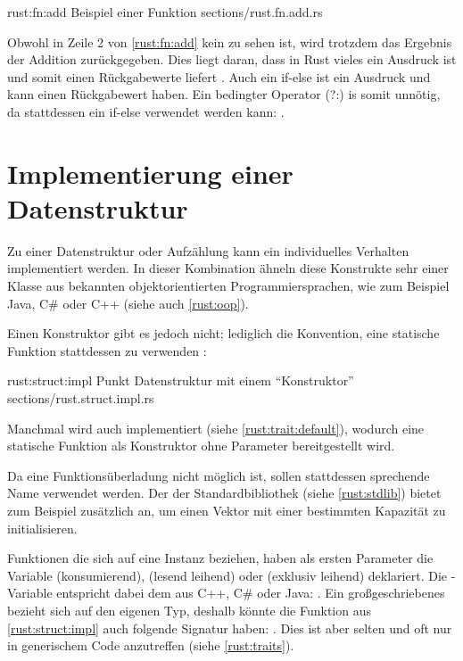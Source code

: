 \rustcinclude
	{rust:fn:add}
	{Beispiel einer Funktion}
	{sections/rust.fn.add.rs}
	
Obwohl in Zeile 2 von \autoref{rust:fn:add} kein  zu sehen ist, wird trotzdem das Ergebnis der Addition zurückgegeben.
Dies liegt daran, dass in Rust vieles ein Ausdruck ist und somit einen Rückgabewerte liefert \cite{rust:book:statements}.
Auch ein if-else ist ein Ausdruck und kann einen Rückgabewert haben.
Ein bedingter Operator (?:) is somit unnötig, da stattdessen ein if-else verwendet werden kann: .



\section{Implementierung einer Datenstruktur}

Zu einer Datenstruktur oder Aufzählung kann ein individuelles Verhalten implementiert werden.
In dieser Kombination ähneln diese Konstrukte sehr einer Klasse aus bekannten objektorientierten Programmiersprachen, wie zum Beispiel Java, C\# oder C++ (siehe auch \autoref{rust:oop}).

Einen Konstruktor gibt es jedoch nicht; lediglich die Konvention, eine statische Funktion  stattdessen zu verwenden \cite{rust:book:constructors}:

\rustcinclude
	{rust:struct:impl}
	{Punkt Datenstruktur mit einem \enquote{Konstruktor}}
	{sections/rust.struct.impl.rs}
	
Manchmal wird auch  implementiert (siehe \autoref{rust:trait:default}), wodurch eine statische Funktion  als Konstruktor ohne Parameter bereitgestellt wird.

Da eine Funktionsüberladung nicht möglich ist, sollen stattdessen sprechende Name verwendet werden.
Der  der Standardbibliothek (siehe \autoref{rust:stdlib}) bietet zum Beispiel zusätzlich  an, um einen Vektor mit einer bestimmten Kapazität zu initialisieren.

Funktionen die sich auf eine Instanz beziehen, haben als ersten Parameter die Variable  (konsumierend),  (lesend leihend) oder  (exklusiv leihend) deklariert.
Die -Variable entspricht dabei dem  aus C++, C\# oder Java:
.
Ein großgeschriebenes  bezieht sich auf den eigenen Typ, deshalb könnte die Funktion aus \autoref{rust:struct:impl} auch folgende Signatur haben: .
Dies ist aber selten und oft nur in generischem Code anzutreffen (siehe \autoref{rust:traits}).

